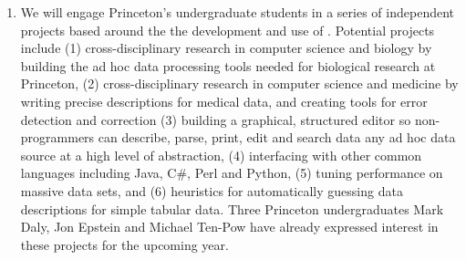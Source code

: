 \documentclass[11pt]{article}
\begin{document}
\begin{enumerate}

\item We will engage Princeton's undergraduate students in 
a series of independent projects based around the the development and use of
\datatype.  Potential projects include (1) cross-disciplinary
research in computer science and biology by building the ad hoc
data processing tools needed for biological research at 
Princeton, (2) cross-disciplinary research in computer science and medicine
by writing precise \datatype{} descriptions for medical data, and creating
tools for 
error detection and correction (3) building a graphical, structured editor 
so non-programmers can
describe, parse, print, edit and search data any ad hoc data source
at a high level of abstraction,
(4) interfacing \datatype{} with other common languages including
Java, C\#, Perl and Python,
(5) tuning performance on massive data sets, and
(6) heuristics for automatically guessing data 
descriptions for simple tabular data.  Three
Princeton undergraduates Mark Daly, Jon Epstein and Michael Ten-Pow
have already expressed interest in these projects for the upcoming year.
\end{enumerate}


\end{document}
